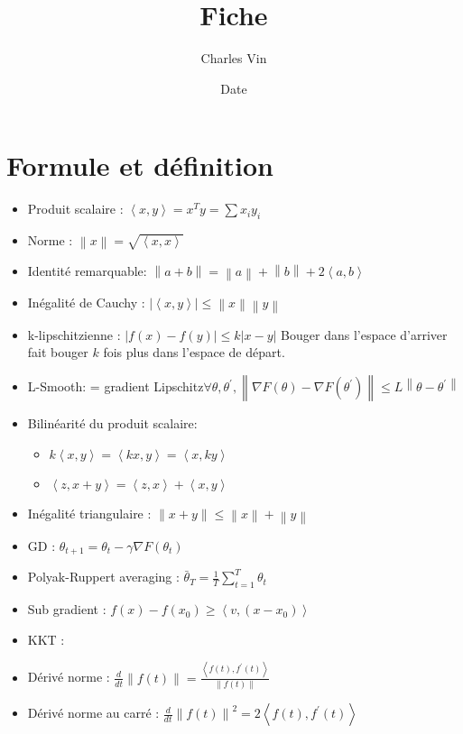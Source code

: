 \documentclass{article}
\title{Fiche}
\author{Charles Vin}
\date{Date}
\theoremstyle{plain}%
\theoremstyle{definition}
\theoremstyle{remark}
\begin{document}
\maketitle

\section{Formule et définition}
\begin{itemize}
    \item Produit scalaire : $ \left\langle x, y \right\rangle = x^T y = \sum x_i y_i $ 
    \item Norme : $ \left\| x \right\| = \sqrt{\left\langle x,x \right\rangle } $ 
    \item Identité remarquable: $ \left\| a + b \right\| = \left\| a \right\| + \left\| b \right\| + 2 \left\langle a,b \right\rangle  $ 
    \item Inégalité de Cauchy : $ \left| \left\langle x,y \right\rangle  \right| \leq \left\| x \right\| \left\| y \right\|   $ 
    \item k-lipschitzienne : $ \left| f(x) - f(y) \right| \leq k \left| x - y \right|  $ Bouger dans l'espace d'arriver fait bouger $ k $ fois plus dans l'espace de départ.
    \item L-Smooth: = gradient Lipschitz$ \forall \theta , \theta ^\prime, \left\| \nabla F(\theta ) - \nabla F(\theta ^\prime ) \right\| \leq  L \left\| \theta - \theta ^\prime  \right\| $ 
    \item Bilinéarité du produit scalaire: \begin{itemize}
        \item $ k \left\langle x, y \right\rangle = \left\langle kx, y \right\rangle = \left\langle x ,ky \right\rangle  $ 
        \item $ \left\langle z, x + y \right\rangle = \left\langle z,x \right\rangle + \left\langle x,y \right\rangle  $ 
    \end{itemize}
    \item Inégalité triangulaire : $ \left\| x + y \right\| \leq \left\| x \right\| + \left\| y \right\|  $ 
    \item GD : $ \theta _{t+1} = \theta _t - \gamma \nabla F(\theta _t) $ 
    \item Polyak-Ruppert averaging : $ \bar{\theta }_T = \frac{1}{T} \sum_{t=1}^{T}\theta _t $ 
    \item Sub gradient : $ f(x) - f(x_0) \geq \left\langle v, (x - x_0) \right\rangle  $ 
    \item KKT : 
    \item Dérivé norme : $ \frac{d}{dt} \left\| f(t) \right\| = \frac{\left\langle f(t) , f^\prime (t) \right\rangle }{\left\| f(t) \right\| } $ 
    \item Dérivé norme au carré : $ \frac{d}{dt} \left\| f(t) \right\| ^2 = 2 \left\langle f(t) , f^\prime (t) \right\rangle $
    

\end{itemize}
\end{document}
